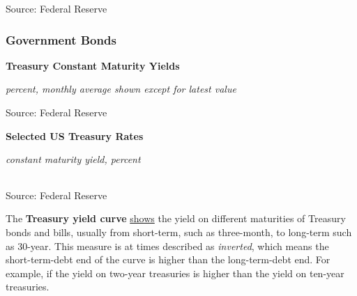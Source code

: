 \documentclass{report}
\makeatletter
\newcommand{\tbllink}[1]{\href{https://raw.githubusercontent.com/bdecon/US-chartbook/master/chartbook/data/#1}{\faTable}}
\newcommand*\short[1]{\expandafter\@gobbletwo\number\numexpr#1\relax}
\newcommand{\stdnode}[3]{\node[below, align=left, shift=({#1,#2})]{#3};}
\newcommand{\dateaxisticks}{
		date coordinates in=x, axis line style={draw=none},
		xmax={2020-10-01},
		max space between ticks=40,	    
		xtick={{1990-01-01}, {1992-01-01}, {1994-01-01}, 
			{1996-01-01}, {1998-01-01}, {2000-01-01}, 
			{2002-01-01}, {2004-01-01}, {2006-01-01},
			{2008-01-01}, {2010-01-01}, {2012-01-01}, {2014-01-01},
		    {2016-01-01}, {2018-01-01}, {2020-01-01}},
		minor xtick={{1989-01-01}, {1991-01-01}, {1993-01-01},
			{1995-01-01}, {1997-01-01}, {1999-01-01}, 
			{2001-01-01}, {2003-01-01}, {2005-01-01}, {2007-01-01},
		    {2009-01-01}, {2011-01-01}, {2013-01-01}, {2015-01-01},
		    {2017-01-01}, {2019-01-01}},
		enlarge y limits={0.06}, enlarge x limits={0.01},
		}
\newcommand{\bbar}[2]{extra #1 ticks = {{#2}}, extra #1 tick labels = ,
		extra #1 tick style = {grid=major, grid style={thick, black!25}},}
\newcommand{\stdline}[4]{\addplot[very thick, no markers, color=#1] 
		table [x=#2, y=#3, col sep=comma] {#4};	}
\newcommand{\rbars}{
		\fill[color=black!10] (axis cs:{1990-07-01},\pgfkeysvalueof{/pgfplots/ymin}) rectangle 
			(axis cs:{1991-03-01}, \pgfkeysvalueof{/pgfplots/ymax});
		\fill[color=black!10] (axis cs:{2007-12-01},\pgfkeysvalueof{/pgfplots/ymin}) rectangle 
			(axis cs:{2009-07-01}, \pgfkeysvalueof{/pgfplots/ymax});
		\fill[color=black!10] (axis cs:{2001-03-01},\pgfkeysvalueof{/pgfplots/ymin}) rectangle 
			(axis cs:{2001-11-01}, \pgfkeysvalueof{/pgfplots/ymax});
		\fill[color=black!10] (axis cs:{2020-02-01},\pgfkeysvalueof{/pgfplots/ymin}) rectangle 
			(axis cs:{2020-10-01}, \pgfkeysvalueof{/pgfplots/ymax});}
\makeatother
\begin{document}
{{{{{{{{{\begin{minipage}{0.76\textwidth}
\footnotesize{Source: Federal Reserve} \hfill \tbllink{rates.csv}
\end{minipage}
\newpage
\begin{minipage}{0.76\textwidth}
\subsubsection*{\color{black!70} \seriffont Government Bonds}
\small  

\vspace{3mm}

\normalsize \textbf{Treasury Constant Maturity Yields}

\footnotesize{\textit{percent, monthly average shown except for latest value }}

\hspace*{-2mm} 

\footnotesize{Source: Federal Reserve} \hfill \tbllink{rates.csv}

\vspace{5mm}

\normalsize \textbf{Selected US Treasury Rates}

\footnotesize{\textit{constant maturity yield, percent}

\hspace*{-1mm}  \setlength{\tabcolsep}{3.1pt} \color{black!90}
		{\renewcommand{\arraystretch}{1.54}
\begin{tabular}{p{19mm} R{10mm} R{10mm} R{10mm} R{10mm}
		 		 R{10mm} R{10mm} R{10mm} R{10mm}}
			 
			 \hline
		\end{tabular}}}

\vspace{1mm}		
		
\footnotesize{Source: Federal Reserve}
\end{minipage}
\newpage
\begin{minipage}{0.76\textwidth}
\small The \textbf{Treasury yield curve} \href{https://www.treasury.gov/resource-center/data-chart-center/interest-rates/Pages/TextView.aspx?data=yield}{shows} the yield on different maturities of Treasury bonds and bills, usually from short-term, such as three-month, to long-term such as 30-year. This measure is at times described as \textit{inverted}, which means the short-term-debt end of the curve is higher than the long-term-debt end. For example, if the yield on two-year treasuries is higher than the yield on ten-year treasuries. \\


\end{minipage}}}}}}}}}}
\end{document}
